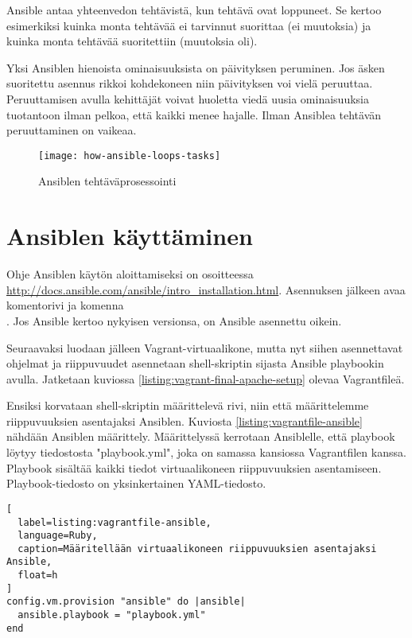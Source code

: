 Ansible antaa yhteenvedon tehtävistä, kun tehtävä ovat loppuneet. Se kertoo esimerkiksi kuinka monta tehtävää ei tarvinnut suorittaa (ei muutoksia) ja kuinka monta tehtävää suoritettiin (muutoksia oli).

Yksi Ansiblen hienoista ominaisuuksista on päivityksen peruminen. Jos äsken suoritettu asennus rikkoi kohdekoneen niin päivityksen voi vielä peruuttaa. Peruuttamisen avulla kehittäjät voivat huoletta viedä uusia ominaisuuksia tuotantoon ilman pelkoa, että kaikki menee hajalle. Ilman Ansiblea tehtävän peruuttaminen on vaikeaa.

\begin{figure}[h]
  \centering
  \texttt{[image: how-ansible-loops-tasks]}
  \caption{Ansiblen tehtäväprosessointi}
  \label{fig:how-ansible-loops-tasks}
\end{figure}

\section{Ansiblen käyttäminen}

Ohje Ansiblen käytön aloittamiseksi on osoitteessa \url{http://docs.ansible.com/ansible/intro_installation.html}. Asennuksen jälkeen avaa komentorivi ja komenna \\ . Jos Ansible kertoo nykyisen versionsa, on Ansible asennettu oikein.

Seuraavaksi luodaan jälleen Vagrant-virtuaalikone, mutta nyt siihen asennettavat ohjelmat ja riippuvuudet asennetaan shell-skriptin sijasta Ansible playbookin avulla. Jatketaan kuviossa \ref{listing:vagrant-final-apache-setup} olevaa Vagrantfileä.

Ensiksi korvataan shell-skriptin määrittelevä rivi, niin että määrittelemme riippuvuuksien asentajaksi Ansiblen. Kuviosta \ref{listing:vagrantfile-ansible} nähdään Ansiblen määrittely. Määrittelyssä kerrotaan Ansiblelle, että playbook löytyy tiedostosta "playbook.yml", joka on samassa kansiossa Vagrantfilen kanssa. Playbook sisältää kaikki tiedot virtuaalikoneen riippuvuuksien asentamiseen. Playbook-tiedosto on yksinkertainen YAML-tiedosto.

\begin{lstlisting}[
  label=listing:vagrantfile-ansible,
  language=Ruby,
  caption=Määritellään virtuaalikoneen riippuvuuksien asentajaksi Ansible,
  float=h
]
config.vm.provision "ansible" do |ansible|
  ansible.playbook = "playbook.yml"
end
\end{lstlisting}

